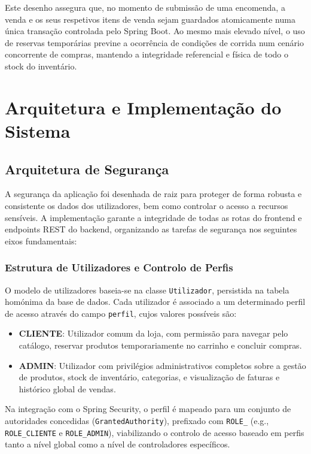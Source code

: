 \documentclass[11pt,a4paper,oneside]{report}
\begin{document}
Este desenho assegura que, no momento de submissão de uma encomenda, a venda e os seus respetivos itens de venda sejam guardados atomicamente numa única transação controlada pelo Spring Boot. Ao mesmo mais elevado nível, o uso de reservas temporárias previne a ocorrência de condições de corrida num cenário concorrente de compras, mantendo a integridade referencial e física de todo o stock do inventário.



\chapter{Arquitetura e Implementação do Sistema}

\section{Arquitetura de Segurança}
A segurança da aplicação foi desenhada de raiz para proteger de forma robusta e consistente os dados dos utilizadores, bem como controlar o acesso a recursos sensíveis. A implementação garante a integridade de todas as rotas do frontend e endpoints REST do backend, organizando as tarefas de segurança nos seguintes eixos fundamentais:

\subsection{Estrutura de Utilizadores e Controlo de Perfis}
O modelo de utilizadores baseia-se na classe \texttt{Utilizador}, persistida na tabela homónima da base de dados. Cada utilizador é associado a um determinado perfil de acesso através do campo \texttt{perfil}, cujos valores possíveis são:
\begin{itemize}
    \item \textbf{CLIENTE}: Utilizador comum da loja, com permissão para navegar pelo catálogo, reservar produtos temporariamente no carrinho e concluir compras.
    \item \textbf{ADMIN}: Utilizador com privilégios administrativos completos sobre a gestão de produtos, stock de inventário, categorias, e visualização de faturas e histórico global de vendas.
\end{itemize}
Na integração com o Spring Security, o perfil é mapeado para um conjunto de autoridades concedidas (\texttt{GrantedAuthority}), prefixado com \texttt{ROLE\_} (e.g., \texttt{ROLE\_CLIENTE} e \texttt{ROLE\_ADMIN}), viabilizando o controlo de acesso baseado em perfis tanto a nível global como a nível de controladores específicos.
\end{document}
